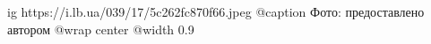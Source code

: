  
 
 
 
 

\ifcmt
  ig https://i.lb.ua/039/17/5c262fc870f66.jpeg
	@caption Фото: предоставлено автором
  @wrap center
  @width 0.9
\fi
